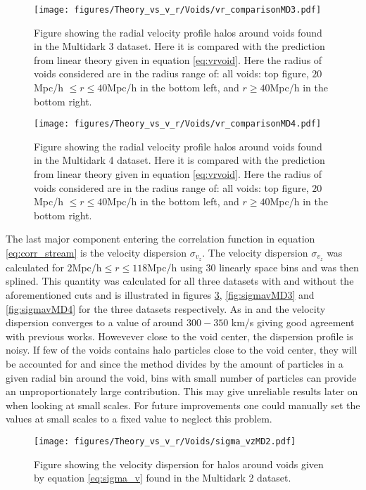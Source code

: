 \begin{figure}[H]
    \texttt{[image: figures/Theory\_vs\_v\_r/Voids/vr\_comparisonMD3.pdf]}
    \caption{Figure showing the radial velocity profile halos around voids found in the Multidark 3 dataset. Here it is compared with the prediction from linear theory given in equation \ref{eq:vrvoid}. Here the radius of voids considered are in the radius range of: all voids: top figure, $20$Mpc/h $\leq r\leq 40$Mpc/h in the bottom left, and $r\geq 40$Mpc/h in the bottom right.}
    \label{fig:vrMD3}
\end{figure}

\begin{figure}[H]
    \texttt{[image: figures/Theory\_vs\_v\_r/Voids/vr\_comparisonMD4.pdf]}
    \caption{Figure showing the radial velocity profile halos around voids found in the Multidark 4 dataset. Here it is compared with the prediction from linear theory given in equation \ref{eq:vrvoid}. Here the radius of voids considered are in the radius range of: all voids: top figure, $20$Mpc/h $\leq r\leq 40$Mpc/h in the bottom left, and $r\geq 40$Mpc/h in the bottom right.}
    \label{fig:vrMD4}
\end{figure}
The last major component entering the correlation function in equation \ref{eq:corr_stream} is the velocity dispersion $\sigma_{v_z}$. The velocity dispersion $\sigma_{v_z}$ was calculated for $2$Mpc/h$\leq r\leq 118$Mpc/h using $30$ linearly space bins and was then splined. This quantity was calculated for all three datasets with and without the aforementioned cuts and is illustrated in figures \ref{fig:sigmavMD2}, \ref{fig:sigmavMD3} and \ref{fig:sigmavMD4} for the three datasets respectively. As in \cite{Nadathur_corr} and \cite{Achitouv_streaming} the velocity dispersion converges to a value of around $300-350$ km/s giving good agreement with previous works. Howevever close to the void center, the dispersion profile is noisy. If few of the voids contains halo particles close to the void center, they will be accounted for and since the method divides by the amount of particles in a given radial bin around the void, bins with small number of particles can provide an unproportionately large contribution. This may give unreliable results later on when looking at small scales. For future improvements one could manually set the values at small scales to a fixed value to neglect this problem.
\begin{figure}[H]
    \texttt{[image: figures/Theory\_vs\_v\_r/Voids/sigma\_vzMD2.pdf]}
    \caption{Figure showing the velocity dispersion for halos around voids given by equation \ref{eq:sigma_v} found in the Multidark 2 dataset.}
    \label{fig:sigmavMD2}
\end{figure}

